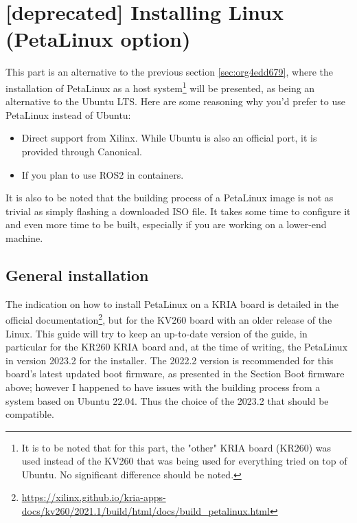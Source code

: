 \documentclass[10pt]{article}
\begin{document}
\section{[deprecated] Installing Linux (PetaLinux option)}
\label{sec:org8f8b750}
This part is an alternative to the previous section \ref{sec:org4edd679},
where the installation of PetaLinux as a host system\footnote{It is to be noted that for this part, the "other" KRIA board (KR260) was
used instead of the KV260 that was being used for everything tried on top of
Ubuntu. No significant difference should be noted.} will be presented,
as being an alternative to the Ubuntu LTS. Here are some reasoning why you'd
prefer to use PetaLinux instead of Ubuntu:
\begin{itemize}
\item Direct support from Xilinx. While Ubuntu is also an official port, it is
provided through Canonical.
\item If you plan to use ROS2 in containers.
\end{itemize}

It is also to be noted that the building process of a PetaLinux image is not as
trivial as simply flashing a downloaded ISO file. It takes some time to
configure it and even more time to be built, especially if you are working on a
lower-end machine.

\subsection{General installation}
\label{sec:orgfe62c8a}
The indication on how to install PetaLinux on a KRIA board is detailed in the
official documentation\footnote{\url{https://xilinx.github.io/kria-apps-docs/kv260/2021.1/build/html/docs/build\_petalinux.html}}, but for the KV260 board with an older release of
the Linux. This guide will try to keep an up-to-date version of the guide, in
particular for the KR260 KRIA board and, at the time of writing, the PetaLinux
in version 2023.2 for the installer.  The 2022.2 version is recommended for this
board's latest updated boot firmware, as presented in the Section Boot firmware
above; however I happened to have issues with the building process from a system
based on Ubuntu 22.04. Thus the choice of the 2023.2 that should be compatible.
\end{document}
